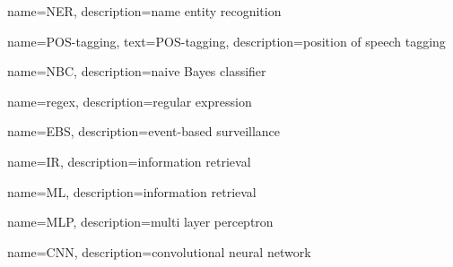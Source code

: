 {
  name={NER},
  description={name entity recognition}
}

{
  name={POS-tagging},
  text={POS-tagging},
  description={position of speech tagging}
}

{
  name={NBC},
  description={naive Bayes classifier}
}

{
  name={regex},
  description={regular expression}
}

{
  name={EBS},
  description={event-based surveillance}
}

{
  name={IR},
  description={information retrieval}
}

{
  name={ML},
  description={information retrieval}
}

{
  name={MLP},
  description={multi layer perceptron}
}

{
  name={CNN},
  description={convolutional neural network}
}
